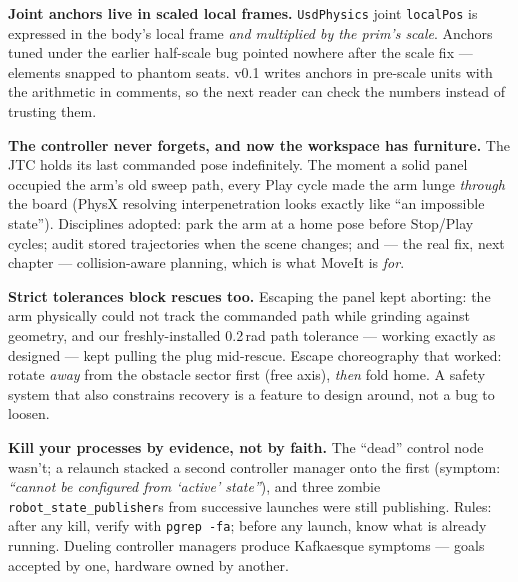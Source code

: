 \begin{lesson}
\textbf{Joint anchors live in scaled local frames.} \texttt{UsdPhysics} joint
\texttt{localPos} is expressed in the body's local frame \emph{and multiplied by the prim's
scale}. Anchors tuned under the earlier half-scale bug pointed nowhere after the scale fix ---
elements snapped to phantom seats. v0.1 writes anchors in pre-scale units with the arithmetic
in comments, so the next reader can check the numbers instead of trusting them.
\end{lesson}

\begin{lesson}
\textbf{The controller never forgets, and now the workspace has furniture.} The JTC holds its
last commanded pose indefinitely. The moment a solid panel occupied the arm's old sweep path,
every Play cycle made the arm lunge \emph{through} the board (PhysX resolving interpenetration
looks exactly like ``an impossible state''). Disciplines adopted: park the arm at a home pose
before Stop/Play cycles; audit stored trajectories when the scene changes; and ---
the real fix, next chapter --- collision-aware planning, which is what MoveIt is \emph{for}.
\end{lesson}

\begin{lesson}
\textbf{Strict tolerances block rescues too.} Escaping the panel kept aborting: the arm
physically could not track the commanded path while grinding against geometry, and our
freshly-installed 0.2\,rad path tolerance --- working exactly as designed --- kept pulling the
plug mid-rescue. Escape choreography that worked: rotate \emph{away} from the obstacle sector
first (free axis), \emph{then} fold home. A safety system that also constrains recovery is a
feature to design around, not a bug to loosen.
\end{lesson}

\begin{lesson}
\textbf{Kill your processes by evidence, not by faith.} The ``dead'' control node wasn't; a
relaunch stacked a second controller manager onto the first (symptom: \emph{``cannot be
configured from `active' state''}), and three zombie \texttt{robot\_state\_publisher}s from
successive launches were still publishing. Rules: after any kill, verify with
\texttt{pgrep -fa}; before any launch, know what is already running. Dueling controller
managers produce Kafkaesque symptoms --- goals accepted by one, hardware owned by another.
\end{lesson}

